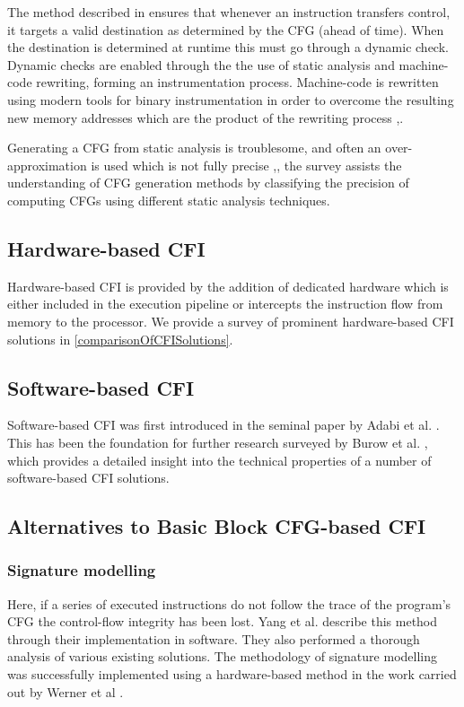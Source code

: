 The method described in \cite{Abadi2005} ensures that whenever an instruction transfers control, it targets a valid destination as determined by the CFG (ahead of time). When the destination is determined at runtime this must go through a dynamic check. Dynamic checks are enabled through the the use of static analysis and machine-code rewriting, forming an instrumentation process. Machine-code is rewritten using modern tools for binary instrumentation in order to overcome the resulting new memory addresses which are the product of the rewriting process \cite{Edwards2001},\cite{Srivastava1994}.

Generating a CFG from static analysis is troublesome, and often an over-approximation is used which is not fully precise \cite{Carlini2015},\cite{Kinder2012}, the survey \cite{Burow} assists the understanding of CFG generation methods by classifying the precision of computing CFGs using different static analysis techniques.

\subsection{Hardware-based CFI}

Hardware-based CFI is provided by the addition of dedicated hardware which is either included in the execution pipeline or intercepts the instruction flow from memory to the processor. We provide a survey of prominent hardware-based CFI solutions in \ref{comparisonOfCFISolutions}.

\subsection{Software-based CFI}

Software-based CFI was first introduced in the seminal paper by Adabi et al. \cite{Abadi2005}. This has been the foundation for further research surveyed by Burow et al. \cite{Burow}, which provides a detailed insight into the technical properties of a number of software-based CFI solutions.

\subsection{Alternatives to Basic Block CFG-based CFI}

\subsubsection{Signature modelling}
Here, if a series of executed instructions do not follow the trace of the program's CFG the control-flow integrity has been lost. Yang et al. \cite{Yang2013} describe this method through their implementation in software. They also performed a thorough analysis of various existing solutions. The methodology of signature modelling was successfully implemented using a hardware-based method in the work carried out by Werner et al \cite{Werner2016}.

